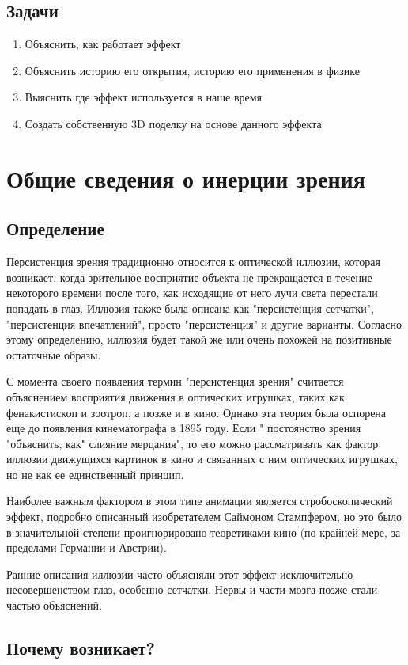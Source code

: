 \documentclass[a4paper, 12pt]{article}
\begin{document}
\subsection{Задачи}
\begin{enumerate}
  \item Объяснить, как работает эффект
  \item Объяснить историю его открытия, историю его применения в физике
  \item Выяснить где эффект используется в наше время
  \item Создать собственную 3D поделку на основе данного эффекта
\end{enumerate}
\newpage
\section{Общие сведения о инерции зрения}
\subsection{Определение}
Персистенция зрения традиционно относится к оптической иллюзии,
которая возникает, когда зрительное восприятие объекта не прекращается
в течение некоторого времени после того, как исходящие от него лучи света
перестали попадать в глаз. Иллюзия также была описана как
"персистенция сетчатки", "персистенция впечатлений", просто "персистенция"
и другие варианты. Согласно этому определению, иллюзия будет такой же
или очень похожей на позитивные остаточные образы.

С момента своего появления термин "персистенция зрения" считается объяснением
восприятия движения в оптических игрушках, таких как фенакистископ и зоотроп,
а позже и в кино. Однако эта теория была оспорена еще до появления кинематографа
в 1895 году. Если " постоянство зрения "объяснить, как" слияние мерцания", то его
можно рассматривать как фактор иллюзии движущихся картинок в кино и связанных с ним
оптических игрушках, но не как ее единственный принцип.

Наиболее важным фактором в этом типе анимации является стробоскопический эффект,
подробно описанный изобретателем Саймоном Стампфером, но это было в значительной
степени проигнорировано теоретиками кино (по крайней мере, за пределами Германии и Австрии).


Ранние описания иллюзии часто объясняли этот эффект исключительно несовершенством
глаз, особенно сетчатки. Нервы и части мозга позже стали частью объяснений.
\subsection{Почему возникает?}
\end{document}
